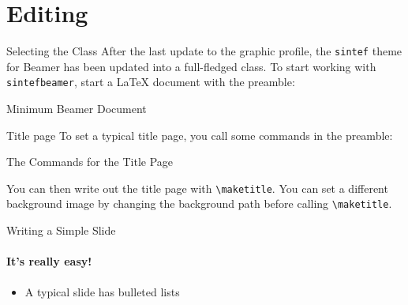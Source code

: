 \documentclass[aspectratio=169]{beamer}
\begin{document}
\section{Editing}

\begin{frame}[fragile]{Selecting the Class}
  After the last update to the graphic profile, the \texttt{sintef} theme for
  Beamer has been updated into a full-fledged class. To start working with
  \texttt{sintefbeamer}, start a \LaTeX{} document with the preamble:

  \begin{ucascodebox}{Minimum Beamer Document}
  \end{ucascodebox}
\end{frame}

\begin{frame}[fragile]{Title page}
  To set a typical title page, you call some commands in the preamble:

  \begin{ucascodebox}{The Commands for the Title Page}
  \end{ucascodebox}

  You can then write out the title page with \verb|\maketitle|.
  You can set a different background image by changing the background path
  before calling \verb|\maketitle|.
\end{frame}

\begin{frame}{Writing a Simple Slide}
  \framesubtitle{It's really easy!}
  \begin{itemize}
    \item A typical slide has bulleted lists
  \end{itemize}
\end{frame}
\end{document}
